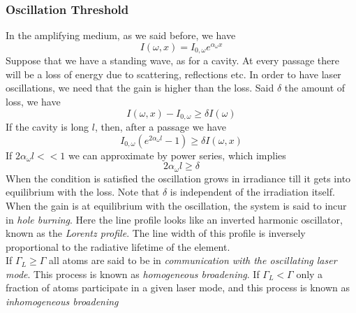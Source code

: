 \documentclass[../electromagnetism.tex]{subfiles}
\begin{document}
\subsubsection{Oscillation Threshold}
In the amplifying medium, as we said before, we have
\begin{equation*}
	I(\omega, x)=I_{0,\omega}e^{\alpha_\omega x}
\end{equation*}
Suppose that we have a standing wave, as for a cavity. At every passage there will be a loss of energy due to scattering, reflections etc. In order to have laser oscillations, we need that the gain is higher than the loss. Said $\delta$ the amount of loss, we have
\begin{equation*}
	I(\omega, x)-I_{0, \omega}\ge\delta I(\omega)
\end{equation*}
If the cavity is long $l$, then, after a passage we have
\begin{equation*}
	I_{0, \omega}\left( e^{2\alpha_\omega l}-1 \right)\ge\delta I(\omega, x)
\end{equation*}
If $2\alpha_\omega l<<1$  we can approximate by power series, which implies
\begin{equation}
	2\alpha_\omega l\ge\delta
	\label{eq:gaincond.ores}
\end{equation}
When the condition is satisfied the oscillation grows in irradiance till it gets into equilibrium with the loss. Note that $\delta$ is independent of the irradiation itself.\\
When the gain is at equilibrium with the oscillation, the system is said to incur in \textit{hole burning}. Here the line profile looks like an inverted harmonic oscillator, known as the \textit{Lorentz profile}. The line width of this profile is inversely proportional to the radiative lifetime of the element.\\
If $\Gamma_L\ge\Gamma$ all atoms are said to be in \textit{communication with the oscillating laser mode}. This process is known as \textit{homogeneous broadening}. If $\Gamma_L<\Gamma$ only a fraction of atoms participate in a given laser mode, and this process is known as \textit{inhomogeneous broadening}
\end{document}
